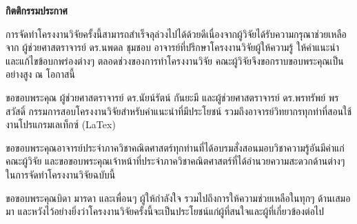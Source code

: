 \thispagestyle{empty}
\vspace{2 cm}
{\huge \bf กิตติกรรมประกาศ}
\vspace{2 cm}

\hspace{1cm}การจัดทำโครงงานวิจัยครั้งนี้สามารถสำเร็จลุล่วงไปได้ด้วยดีเนื่องจากผู้วิจัยได้รับความกรุณาช่วยเหลือจาก ผู้ช่วยศาสตราจารย์ ดร.นพดล ชุมชอบ อาจารย์ที่ปรึกษาโครงงานวิจัยผู้ให้ความรู้ ให้คำแนะนำและแก้ไขข้อบกพร่องต่างๆ ตลอดช่วงของการทำโครงงานวิจัย คณะผู้วิจัยจึงขอกราบขอบพระคุณเป็นอย่างสูง ณ โอกาสนี้

\hspace{1cm}ขอขอบพระคุณ ผู้ช่วยศาสตราจารย์ ดร.นัยน์รัตน์ กันยะมี และผู้ช่วยศาสตราจารย์ ดร.พรทรัพย์ พรสวัสดิ์ กรรมการสอบโครงงานวิจัยสำหรับคำแนะนำที่มีประโยชน์ รวมถึงอาจารย์วิทยากรทุกท่าที่สอนใช้งานโปรแกรมเลเท็กซ์ (LaTex)

\hspace{1cm}ขอขอบพระคุณอาจารย์ประจำภาควิชาคณิตศาสตร์ทุกท่านที่ได้อบรมสั่งสอนมอบวิชาความรู้อันมีค่าแก่คณะผู้วิจัย และขอขอบพระคุณเจ้าหน้าที่ประจำภาควิชาคณิตศาสตร์ที่ได้อำนวยความสะดวกด้านต่างๆ ในการจัดทำโครงงานวิจัยฉบับนี้

\hspace{1cm}ขอขอบพระคุณบิดา มารดา และเพื่อนๆ ผู้ให้กำลังใจ รวมไปถึงการให้ความช่วยเหลือในทุกๆ ด้านเสมอมา และหวังไว้อย่างยิ่งว่าโครงงานวิจัยครั้งนี้จะเป็นประโยชน์แก่ผู้ที่สนใจและผู้ที่เกี่ยวข้องต่อไป



\newpage